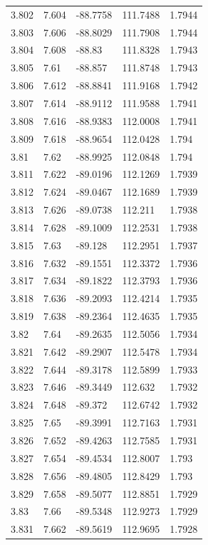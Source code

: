 \begin{tabular}{lllll}
3.802 & 7.604 & -88.7758 & 111.7488 & 1.7944 \\
3.803 & 7.606 & -88.8029 & 111.7908 & 1.7944 \\
3.804 & 7.608 & -88.83 & 111.8328 & 1.7943 \\
3.805 & 7.61 & -88.857 & 111.8748 & 1.7943 \\
3.806 & 7.612 & -88.8841 & 111.9168 & 1.7942 \\
3.807 & 7.614 & -88.9112 & 111.9588 & 1.7941 \\
3.808 & 7.616 & -88.9383 & 112.0008 & 1.7941 \\
3.809 & 7.618 & -88.9654 & 112.0428 & 1.794 \\
3.81 & 7.62 & -88.9925 & 112.0848 & 1.794 \\
3.811 & 7.622 & -89.0196 & 112.1269 & 1.7939 \\
3.812 & 7.624 & -89.0467 & 112.1689 & 1.7939 \\
3.813 & 7.626 & -89.0738 & 112.211 & 1.7938 \\
3.814 & 7.628 & -89.1009 & 112.2531 & 1.7938 \\
3.815 & 7.63 & -89.128 & 112.2951 & 1.7937 \\
3.816 & 7.632 & -89.1551 & 112.3372 & 1.7936 \\
3.817 & 7.634 & -89.1822 & 112.3793 & 1.7936 \\
3.818 & 7.636 & -89.2093 & 112.4214 & 1.7935 \\
3.819 & 7.638 & -89.2364 & 112.4635 & 1.7935 \\
3.82 & 7.64 & -89.2635 & 112.5056 & 1.7934 \\
3.821 & 7.642 & -89.2907 & 112.5478 & 1.7934 \\
3.822 & 7.644 & -89.3178 & 112.5899 & 1.7933 \\
3.823 & 7.646 & -89.3449 & 112.632 & 1.7932 \\
3.824 & 7.648 & -89.372 & 112.6742 & 1.7932 \\
3.825 & 7.65 & -89.3991 & 112.7163 & 1.7931 \\
3.826 & 7.652 & -89.4263 & 112.7585 & 1.7931 \\
3.827 & 7.654 & -89.4534 & 112.8007 & 1.793 \\
3.828 & 7.656 & -89.4805 & 112.8429 & 1.793 \\
3.829 & 7.658 & -89.5077 & 112.8851 & 1.7929 \\
3.83 & 7.66 & -89.5348 & 112.9273 & 1.7929 \\
3.831 & 7.662 & -89.5619 & 112.9695 & 1.7928 \\

\end{tabular}
